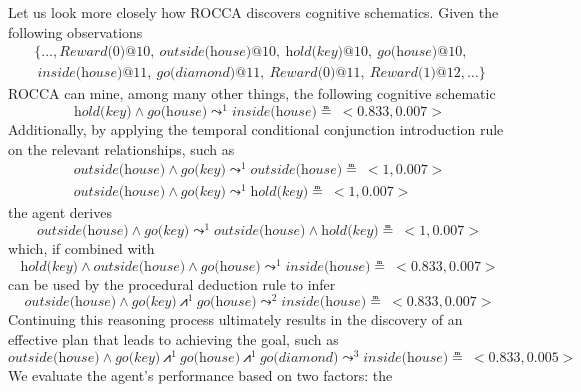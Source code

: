 \documentclass[runningheads]{llncs}
\newcommand{\lpreimp}[1]{\leadsto^{#1}}
\newcommand{\lseqand}[1]{\!\bigslopedwedge^{#1}\!}
\begin{document}
Let us look more closely how ROCCA discovers cognitive
schematics. Given the following observations
$$
\begin{array}{l}
\{\dots, \textit{Reward(0)@10},\ \textit{outside(house)@10},\
\textit{hold(key)@10},\ \textit{go(house)@10},\\ \ \textit{inside(house)@11},\ \textit{go(diamond)@11},\ \textit{Reward(0)@11},\ \textit{Reward(1)@12}, \dots\}
\end{array}
$$
ROCCA can mine, among many other things, the following cognitive schematic
$$
\textit{hold(key)} \land \textit{go(house)} \lpreimp{1} \textit{inside(house)} \measeq\ <\!0.833, 0.007\!>
$$
Additionally, by applying the temporal conditional conjunction
introduction rule on the relevant relationships, such as
$$
\begin{array}{l}
\textit{outside(house)} \land \textit{go(key)} \lpreimp{1} \textit{outside(house)} \measeq\ <\!1, 0.007\!> \\
\textit{outside(house)} \land \textit{go(key)} \lpreimp{1} \textit{hold(key)} \measeq\ <\!1, 0.007\!>
\end{array}
$$
the agent derives
$$\textit{outside(house)} \land \textit{go(key)} \lpreimp{1}
\textit{outside(house)} \land \textit{hold(key)} \measeq\ <\!1, 0.007\!>$$
which, if combined with
$$\textit{hold(key)} \land \textit{outside(house)} \land \textit{go(house)} \lpreimp{1} \textit{inside(house)} \measeq\ <\!0.833, 0.007\!>$$
can be used by the procedural deduction rule to infer
$$\textit{outside(house)} \land \textit{go(key)} \lseqand{1} \textit{go(house)} \lpreimp{2} \textit{inside(house)} \measeq\ <\!0.833, 0.007\!>$$
Continuing this reasoning process ultimately results in the discovery
of an effective plan that leads to achieving the goal, such as
{\small
$$\textit{outside(house)} \land \textit{go(key)} \lseqand{1}
\textit{go(house)} \lseqand{1} \textit{go(diamond)} \lpreimp{3}
\textit{inside(house)} \measeq\ <\!0.833, 0.005\!>$$ }
We evaluate the agent's performance based on two factors: the
\end{document}
